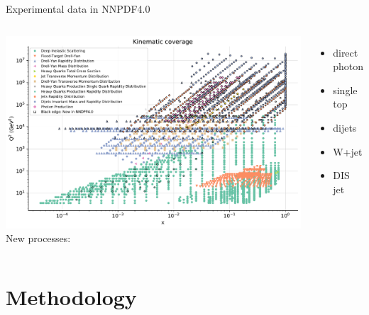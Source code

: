 \documentclass[aspectratio=169,9pt]{beamer}
\begin{document}
\begin{frame}{Experimental data in NNPDF4.0}
    \begin{columns}
            \includegraphics[width=1.0\textwidth]{Markers0_plot_xq2}
            New processes:
            \begin{itemize}
                \item direct photon
                \item single top
                \item dijets
                \item W+jet
                \item DIS jet
            \end{itemize}
    \end{columns}
\end{frame}








\section{Methodology}
\end{document}
